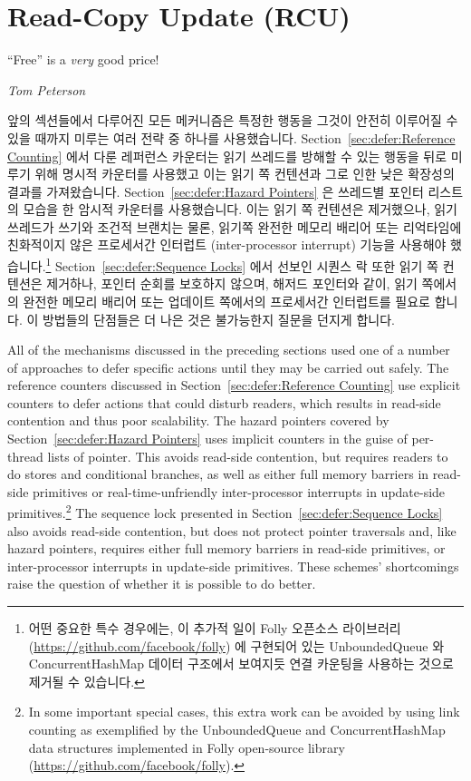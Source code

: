 
\section{Read-Copy Update (RCU)}
\label{sec:defer:Read-Copy Update (RCU)}
%
\epigraph{``Free'' is a \emph{very} good price!}{\emph{Tom Peterson}}

앞의 섹션들에서 다루어진 모든 메커니즘은 특정한 행동을 그것이 안전히 이루어질
수 있을 때까지 미루는 여러 전략 중 하나를 사용했습니다.
Section~\ref{sec:defer:Reference Counting}
에서 다룬 레퍼런스 카운터는 읽기 쓰레드를 방해할 수 있는 행동을 뒤로 미루기
위해 명시적 카운터를 사용했고 이는 읽기 쪽 컨텐션과 그로 인한 낮은 확장성의
결과를 가져왔습니다.
Section~\ref{sec:defer:Hazard Pointers}
은 쓰레드별 포인터 리스트의 모습을 한 암시적 카운터를 사용했습니다.
이는 읽기 쪽 컨텐션은 제거했으나, 읽기 쓰레드가 쓰기와 조건적 브랜치는 물론,
읽기쪽 완전한 메모리 배리어 또는 리억타임에 친화적이지 않은 프로세서간 인터럽트
(inter-processor interrupt) 기능을 사용해야 했습니다.\footnote{
	어떤 중요한 특수 경우에는, 이 추가적 일이 Folly 오픈소스 라이브러리
	(\url{https://github.com/facebook/folly}) 에 구현되어 있는
	UnboundedQueue 와 ConcurrentHashMap 데이터 구조에서 보여지듯 연결
	카운팅을 사용하는 것으로 제거될 수 있습니다.}
Section~\ref{sec:defer:Sequence Locks}
에서 선보인 시퀀스 락 또한 읽기 쪽 컨텐션은 제거하나, 포인터 순회를 보호하지
않으며, 해저드 포인터와 같이, 읽기 쪽에서의 완전한 메모리 배리어 또는 업데이트
쪽에서의 프로세서간 인터럽트를 필요로 합니다.
이 방법들의 단점들은 더 나은 것은 불가능한지 질문을 던지게 합니다.

\iffalse

All of the mechanisms discussed in the preceding sections
used one of a number of approaches to defer specific actions
until they may be carried out safely.
The reference counters discussed in
Section~\ref{sec:defer:Reference Counting}
use explicit counters to defer actions that could disturb readers,
which results in read-side contention and thus poor scalability.
The hazard pointers covered by
Section~\ref{sec:defer:Hazard Pointers}
uses implicit counters in the guise of per-thread lists of pointer.
This avoids read-side contention, but requires readers to do stores and
conditional branches, as well as either full memory barriers in read-side
primitives or real-time-unfriendly inter-processor interrupts in
update-side primitives.\footnote{
	In some important special cases, this extra work can be avoided
	by using link counting as exemplified by the UnboundedQueue
	and ConcurrentHashMap data structures implemented in Folly
	open-source library
	(\url{https://github.com/facebook/folly}).}
The sequence lock presented in
Section~\ref{sec:defer:Sequence Locks}
also avoids read-side contention, but does not protect pointer
traversals and, like hazard pointers, requires either full memory barriers
in read-side primitives, or inter-processor interrupts in update-side
primitives.
These schemes' shortcomings raise the question of
whether it is possible to do better.

